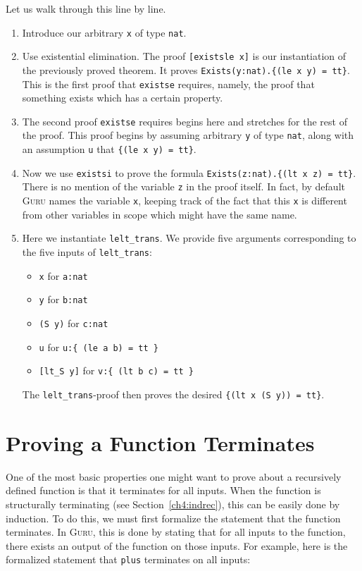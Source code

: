 \documentclass{book}[12pt]
\newcommand{\guru}[0]{\textsc{Guru}\xspace}
\begin{document}
\noindent Let us walk through this line by line.

\begin{enumerate}
\item Introduce our arbitrary \texttt{x} of type \texttt{nat}.
\item Use existential elimination.  The proof \texttt{[existsle x]} is
our instantiation of the previously proved theorem.  It proves
\texttt{Exists(y:nat).\{(le x y) = tt\}}.  This is the first proof that
\texttt{existse} requires, namely, the proof that something exists which
has a certain property.
\item The second proof \texttt{existse} requires begins here and
stretches for the rest of the proof.  This proof begins by assuming
arbitrary \texttt{y} of type \texttt{nat}, along with an assumption
\texttt{u} that \texttt{\{(le x y) = tt\}}.
\item Now we use \texttt{existsi} to prove the formula
\texttt{Exists(z:nat).\{(lt x z) = tt\}}.  There is no mention of the
variable \texttt{z} in the proof itself.  In fact, by default \guru
names the variable \texttt{x}, keeping track of the fact that this
\texttt{x} is different from other variables in scope which might have
the same name.
\item Here we instantiate \texttt{lelt\_trans}.  We provide five arguments
corresponding to the five inputs of \texttt{lelt\_trans}:
\begin{itemize}
\item \texttt{x} for \texttt{a:nat}
\item \texttt{y} for \texttt{b:nat}
\item \texttt{(S y)} for \texttt{c:nat}
\item \texttt{u} for \texttt{u:\{ (le a b) = tt \}}
\item \texttt{[lt\_S y]} for \texttt{v:\{ (lt b c) = tt \}}
\end{itemize}

\noindent The \texttt{lelt\_trans}-proof then proves the desired \texttt{\{(lt x (S y)) = tt\}}.
\end{enumerate}

\section{Proving a Function Terminates}

One of the most basic properties one might want to prove about a
recursively defined function is that it terminates for all inputs.
When the function is structurally terminating (see
Section~\ref{ch4:indrec}), this can be easily done by induction.  To
do this, we must first formalize the statement that the function
terminates.  In \guru, this is done by stating that for all inputs to
the function, there exists an output of the function on those inputs.
For example, here is the formalized statement that \texttt{plus}
terminates on all inputs:
\end{document}
